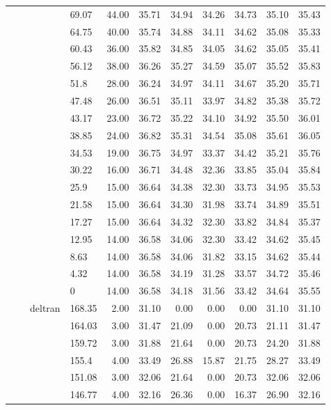 \begin{longtable}{llllrrrrrrr}
   &  &  & 69.07 & 44.00 & 35.71 & 34.94 & 34.26 & 34.73 & 35.10 & 35.43 \\ 
   &  &  & 64.75 & 40.00 & 35.74 & 34.88 & 34.11 & 34.62 & 35.08 & 35.33 \\ 
   &  &  & 60.43 & 36.00 & 35.82 & 34.85 & 34.05 & 34.62 & 35.05 & 35.41 \\ 
   &  &  & 56.12 & 38.00 & 36.26 & 35.27 & 34.59 & 35.07 & 35.52 & 35.83 \\ 
   &  &  & 51.8 & 28.00 & 36.24 & 34.97 & 34.11 & 34.67 & 35.20 & 35.71 \\ 
   &  &  & 47.48 & 26.00 & 36.51 & 35.11 & 33.97 & 34.82 & 35.38 & 35.72 \\ 
   &  &  & 43.17 & 23.00 & 36.72 & 35.22 & 34.10 & 34.92 & 35.50 & 36.01 \\ 
   &  &  & 38.85 & 24.00 & 36.82 & 35.31 & 34.54 & 35.08 & 35.61 & 36.05 \\ 
   &  &  & 34.53 & 19.00 & 36.75 & 34.97 & 33.37 & 34.42 & 35.21 & 35.76 \\ 
   &  &  & 30.22 & 16.00 & 36.71 & 34.48 & 32.36 & 33.85 & 35.04 & 35.84 \\ 
   &  &  & 25.9 & 15.00 & 36.64 & 34.38 & 32.30 & 33.73 & 34.95 & 35.53 \\ 
   &  &  & 21.58 & 15.00 & 36.64 & 34.30 & 31.98 & 33.74 & 34.89 & 35.51 \\ 
   &  &  & 17.27 & 15.00 & 36.64 & 34.32 & 32.30 & 33.82 & 34.84 & 35.37 \\ 
   &  &  & 12.95 & 14.00 & 36.58 & 34.06 & 32.30 & 33.42 & 34.62 & 35.45 \\ 
   &  &  & 8.63 & 14.00 & 36.58 & 34.06 & 31.82 & 33.15 & 34.62 & 35.44 \\ 
   &  &  & 4.32 & 14.00 & 36.58 & 34.19 & 31.28 & 33.57 & 34.72 & 35.46 \\ 
   &  &  & 0 & 14.00 & 36.58 & 34.18 & 31.56 & 33.42 & 34.64 & 35.55 \\ 
   &  & deltran & 168.35 & 2.00 & 31.10 & 0.00 & 0.00 & 0.00 & 31.10 & 31.10 \\ 
   &  &  & 164.03 & 3.00 & 31.47 & 21.09 & 0.00 & 20.73 & 21.11 & 31.47 \\ 
   &  &  & 159.72 & 3.00 & 31.88 & 21.64 & 0.00 & 20.73 & 24.20 & 31.88 \\ 
   &  &  & 155.4 & 4.00 & 33.49 & 26.88 & 15.87 & 21.75 & 28.27 & 33.49 \\ 
   &  &  & 151.08 & 3.00 & 32.06 & 21.64 & 0.00 & 20.73 & 32.06 & 32.06 \\ 
   &  &  & 146.77 & 4.00 & 32.16 & 26.36 & 0.00 & 16.37 & 26.90 & 32.16 \\ 

\end{longtable}

